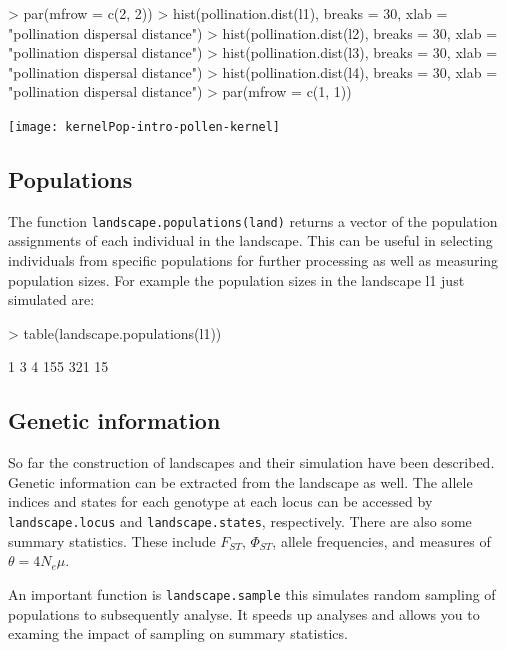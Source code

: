 \documentclass[10pt]{article}
\newcommand{\code}[1]{\texttt{#1}}
\begin{document}
\begin{Schunk}
\begin{Sinput}
> par(mfrow = c(2, 2))
> hist(pollination.dist(l1), breaks = 30, xlab = "pollination dispersal distance")
> hist(pollination.dist(l2), breaks = 30, xlab = "pollination dispersal distance")
> hist(pollination.dist(l3), breaks = 30, xlab = "pollination dispersal distance")
> hist(pollination.dist(l4), breaks = 30, xlab = "pollination dispersal distance")
> par(mfrow = c(1, 1))
\end{Sinput}
\end{Schunk}
\texttt{[image: kernelPop-intro-pollen-kernel]}

\subsection{Populations}
\label{sec:populations}

The function \code{landscape.populations(land)} returns a vector of
the population assignments of each individual in the landscape.  This can be useful in selecting individuals from specific populations for further processing as well as measuring population sizes.  For example the population sizes in the landscape l1 just simulated are:
\begin{Schunk}
\begin{Sinput}
> table(landscape.populations(l1))
\end{Sinput}
\begin{Soutput}
  1   3   4 
155 321  15 
\end{Soutput}
\end{Schunk}

\subsection{Genetic information}
\label{sec:genetic-information}

So far the construction of landscapes and their simulation have been
described.  Genetic information can be extracted from the landscape as
well.  The allele indices and states for each genotype at each locus
can be accessed by \code{landscape.locus} and \code{landscape.states},
respectively. There are also some summary statistics. These include
$F_{ST}$, $\Phi_{ST}$, allele frequencies, and measures of $\theta =
4N_e\mu$.

An important function is \code{landscape.sample} this simulates random
sampling of populations to subsequently analyse.  It speeds up
analyses and allows you to examing the impact of sampling on summary
statistics.
\end{document}

